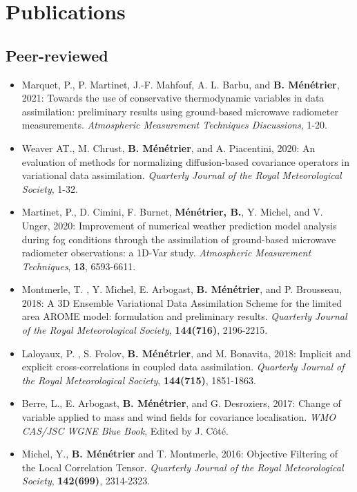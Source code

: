 \documentclass[a4paper,9pt]{scrreprt}
\begin{document}
\section*{Publications}

\subsection*{Peer-reviewed}

\begin{itemize}
\item Marquet, P., P. Martinet, J.-F. Mahfouf, A. L. Barbu, and \textbf{B. Ménétrier}, 2021: Towards the use of conservative thermodynamic variables in data assimilation: preliminary results using ground-based microwave radiometer measurements. \textit{Atmospheric Measurement Techniques Discussions}, 1-20.
\item Weaver AT., M. Chrust, \textbf{B. Ménétrier}, and A. Piacentini, 2020: An evaluation of methods for normalizing diffusion-based covariance operators in variational data assimilation. \textit{Quarterly Journal of the Royal Meteorological Society}, 1-32.
\item Martinet, P., D. Cimini, F. Burnet, \textbf{Ménétrier, B.}, Y. Michel, and V. Unger, 2020: Improvement of numerical weather prediction model analysis during fog conditions through the assimilation of ground-based microwave radiometer observations: a 1D-Var study. \textit{Atmospheric Measurement Techniques}, \textbf{13}, 6593-6611.
\item Montmerle, T. , Y. Michel, E. Arbogast,  \textbf{B. Ménétrier}, and P. Brousseau, 2018: A 3D Ensemble Variational Data Assimilation Scheme for the limited area AROME model: formulation and preliminary results. \textit{Quarterly Journal of the Royal Meteorological Society}, \textbf{144(716)}, 2196-2215.\vspace{-0.1cm}
\item Laloyaux, P. , S. Frolov, \textbf{B. Ménétrier}, and M. Bonavita, 2018: Implicit and explicit cross‐correlations in coupled data assimilation. \textit{Quarterly Journal of the Royal Meteorological Society}, \textbf{144(715)}, 1851-1863.\vspace{-0.1cm}
\item Berre, L., E. Arbogast, \textbf{B. Ménétrier}, and G. Desroziers, 2017: Change of variable applied to mass and wind fields for covariance localisation. \textit{WMO CAS/JSC WGNE Blue Book}, Edited by J. Côté.\vspace{-0.1cm}
\item Michel, Y., \textbf{B. Ménétrier} and T. Montmerle, 2016: Objective Filtering of the Local Correlation Tensor. \textit{Quarterly Journal of the Royal Meteorological Society}, \textbf{142(699)}, 2314-2323. \vspace{-0.1cm}

\end{itemize}
\end{document}
